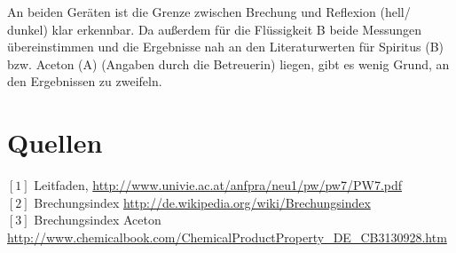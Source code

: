 \documentclass[12pt,a4paper]{article}
\begin{document}
\begin{multicols}{2}
An beiden Geräten ist die Grenze zwischen Brechung und Reflexion (hell/ dunkel) klar erkennbar. Da außerdem für die Flüssigkeit B beide Messungen übereinstimmen und die Ergebnisse nah an den Literaturwerten für Spiritus (B) bzw. Aceton (A) (Angaben durch die Betreuerin) liegen, gibt es wenig Grund, an den Ergebnissen zu zweifeln.


\section{Quellen}
$[1]$ Leitfaden, \url{http://www.univie.ac.at/anfpra/neu1/pw/pw7/PW7.pdf}\\
$[2]$ Brechungsindex \url{http://de.wikipedia.org/wiki/Brechungsindex}\\
$[3]$ Brechungsindex Aceton \url{http://www.chemicalbook.com/ChemicalProductProperty_DE_CB3130928.htm}

\end{multicols}
\end{document}
